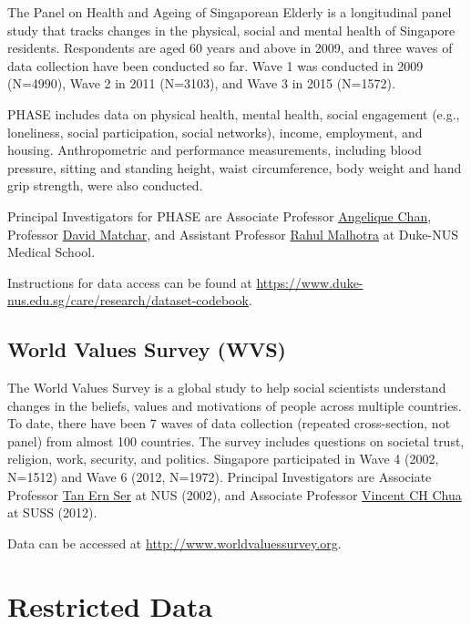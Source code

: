 \documentclass[openany]{book}
\begin{document}
The Panel on Health and Ageing of Singaporean Elderly is a longitudinal
panel study that tracks changes in the physical, social and mental
health of Singapore residents. Respondents are aged 60 years and above
in 2009, and three waves of data collection have been conducted so far.
Wave 1 was conducted in 2009 (N=4990), Wave 2 in 2011 (N=3103), and Wave
3 in 2015 (N=1572).

PHASE includes data on physical health, mental health, social engagement
(e.g., loneliness, social participation, social networks), income,
employment, and housing. Anthropometric and performance measurements,
including blood pressure, sitting and standing height, waist
circumference, body weight and hand grip strength, were also conducted.

Principal Investigators for PHASE are Associate Professor
\href{https://www.duke-nus.edu.sg/hssr/our-team/faculty/faculty-staff-details/Detail/13200}{Angelique
Chan}, Professor
\href{https://www.duke-nus.edu.sg/hssr/our-team/faculty/faculty-staff-details/Detail/31920}{David
Matchar}, and Assistant Professor
\href{https://www.duke-nus.edu.sg/hssr/our-team/faculty/faculty-staff-details/Detail/30743}{Rahul
Malhotra} at Duke-NUS Medical School.

Instructions for data access can be found at
\url{https://www.duke-nus.edu.sg/care/research/dataset-codebook}.

\section{World Values Survey (WVS)}\label{wvs}

The World Values Survey is a global study to help social scientists
understand changes in the beliefs, values and motivations of people
across multiple countries. To date, there have been 7 waves of data
collection (repeated cross-section, not panel) from almost 100
countries. The survey includes questions on societal trust, religion,
work, security, and politics. Singapore participated in Wave 4 (2002,
N=1512) and Wave 6 (2012, N=1972). Principal Investigators are Associate
Professor \href{http://profile.nus.edu.sg/fass/soctanes/}{Tan Ern Ser}
at NUS (2002), and Associate Professor
\href{https://www.suss.edu.sg/about-suss/faculty-and-staff/detail/vincent-chua}{Vincent
CH Chua} at SUSS (2012).

Data can be accessed at \url{http://www.worldvaluessurvey.org}.

\chapter{Restricted Data}\label{restricteddata}
\end{document}
